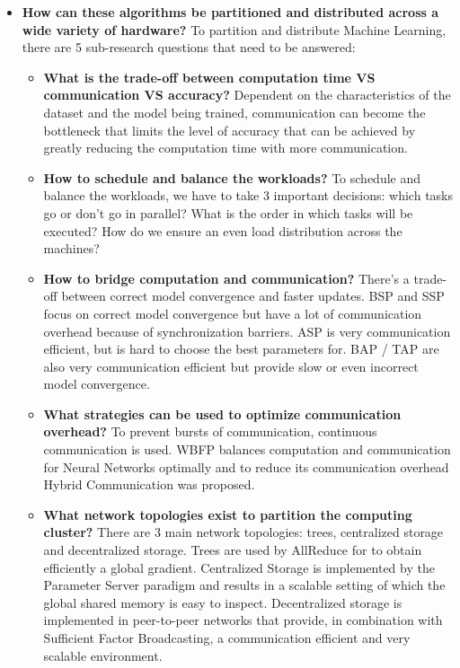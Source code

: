 \begin{itemize}
\begin{itemize}
\begin{itemize}
		\end{itemize}
		\item \textbf{How can these algorithms be partitioned and distributed across a wide variety of hardware?} To partition and distribute Machine Learning, there are 5 sub-research questions that need to be answered:
		\begin{itemize}
			\item \textbf{What is the trade-off between computation time VS communication VS accuracy?} Dependent on the characteristics of the dataset and the model being trained, communication can become the bottleneck that limits the level of accuracy that can be achieved by greatly reducing the computation time with more communication.
			\item \textbf{How to schedule and balance the workloads?} To schedule and balance the workloads, we have to take 3 important decisions: which tasks go or don't go in parallel? What is the order in which tasks will be executed? How do we ensure an even load distribution across the machines?
			\item \textbf{How to bridge computation and communication?} There's a trade-off between correct model convergence and faster updates. BSP and SSP focus on correct model convergence but have a lot of communication overhead because of synchronization barriers. ASP is very communication efficient, but is hard to choose the best parameters for. BAP / TAP are also very communication efficient but provide slow or even incorrect model convergence.
			\item \textbf{What strategies can be used to optimize communication overhead?} To prevent bursts of communication, continuous communication is used. WBFP balances computation and communication for Neural Networks optimally and to reduce its communication overhead Hybrid Communication was proposed.
			\item \textbf{What network topologies exist to partition the computing cluster?} There are 3 main network topologies: trees, centralized storage and decentralized storage. Trees are used by AllReduce for to obtain efficiently a global gradient. Centralized Storage is implemented by the Parameter Server paradigm and results in a scalable setting of which the global shared memory is easy to inspect. Decentralized storage is implemented in peer-to-peer networks that provide, in combination with Sufficient Factor Broadcasting, a communication efficient and very scalable environment.
		\end{itemize}
	\end{itemize}

\end{itemize}
